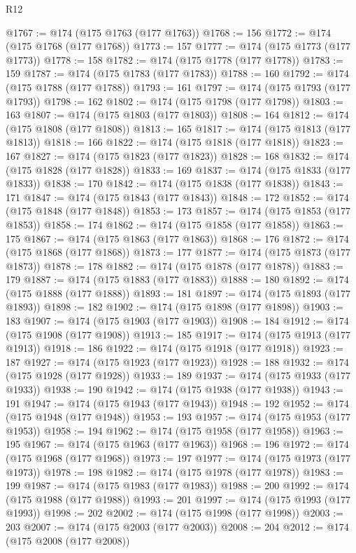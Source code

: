 \begin{lexlean}{R12}
\begin{coremodule}
{{{{{{{{{{{{{{{{{{{{{{{{{{{{{{{{{{{{{{{{{{{{{{{{{{{{{{{{{{{{{{{{{{{{{{{{{{{{{{{{{{{{{{{{{{{{{{{{{{{{{{{{{{@1767 := @174 (@175 @1763 (@177 @1763))
@1768 := 156
@1772 := @174 (@175 @1768 (@177 @1768))
@1773 := 157
@1777 := @174 (@175 @1773 (@177 @1773))
@1778 := 158
@1782 := @174 (@175 @1778 (@177 @1778))
@1783 := 159
@1787 := @174 (@175 @1783 (@177 @1783))
@1788 := 160
@1792 := @174 (@175 @1788 (@177 @1788))
@1793 := 161
@1797 := @174 (@175 @1793 (@177 @1793))
@1798 := 162
@1802 := @174 (@175 @1798 (@177 @1798))
@1803 := 163
@1807 := @174 (@175 @1803 (@177 @1803))
@1808 := 164
@1812 := @174 (@175 @1808 (@177 @1808))
@1813 := 165
@1817 := @174 (@175 @1813 (@177 @1813))
@1818 := 166
@1822 := @174 (@175 @1818 (@177 @1818))
@1823 := 167
@1827 := @174 (@175 @1823 (@177 @1823))
@1828 := 168
@1832 := @174 (@175 @1828 (@177 @1828))
@1833 := 169
@1837 := @174 (@175 @1833 (@177 @1833))
@1838 := 170
@1842 := @174 (@175 @1838 (@177 @1838))
@1843 := 171
@1847 := @174 (@175 @1843 (@177 @1843))
@1848 := 172
@1852 := @174 (@175 @1848 (@177 @1848))
@1853 := 173
@1857 := @174 (@175 @1853 (@177 @1853))
@1858 := 174
@1862 := @174 (@175 @1858 (@177 @1858))
@1863 := 175
@1867 := @174 (@175 @1863 (@177 @1863))
@1868 := 176
@1872 := @174 (@175 @1868 (@177 @1868))
@1873 := 177
@1877 := @174 (@175 @1873 (@177 @1873))
@1878 := 178
@1882 := @174 (@175 @1878 (@177 @1878))
@1883 := 179
@1887 := @174 (@175 @1883 (@177 @1883))
@1888 := 180
@1892 := @174 (@175 @1888 (@177 @1888))
@1893 := 181
@1897 := @174 (@175 @1893 (@177 @1893))
@1898 := 182
@1902 := @174 (@175 @1898 (@177 @1898))
@1903 := 183
@1907 := @174 (@175 @1903 (@177 @1903))
@1908 := 184
@1912 := @174 (@175 @1908 (@177 @1908))
@1913 := 185
@1917 := @174 (@175 @1913 (@177 @1913))
@1918 := 186
@1922 := @174 (@175 @1918 (@177 @1918))
@1923 := 187
@1927 := @174 (@175 @1923 (@177 @1923))
@1928 := 188
@1932 := @174 (@175 @1928 (@177 @1928))
@1933 := 189
@1937 := @174 (@175 @1933 (@177 @1933))
@1938 := 190
@1942 := @174 (@175 @1938 (@177 @1938))
@1943 := 191
@1947 := @174 (@175 @1943 (@177 @1943))
@1948 := 192
@1952 := @174 (@175 @1948 (@177 @1948))
@1953 := 193
@1957 := @174 (@175 @1953 (@177 @1953))
@1958 := 194
@1962 := @174 (@175 @1958 (@177 @1958))
@1963 := 195
@1967 := @174 (@175 @1963 (@177 @1963))
@1968 := 196
@1972 := @174 (@175 @1968 (@177 @1968))
@1973 := 197
@1977 := @174 (@175 @1973 (@177 @1973))
@1978 := 198
@1982 := @174 (@175 @1978 (@177 @1978))
@1983 := 199
@1987 := @174 (@175 @1983 (@177 @1983))
@1988 := 200
@1992 := @174 (@175 @1988 (@177 @1988))
@1993 := 201
@1997 := @174 (@175 @1993 (@177 @1993))
@1998 := 202
@2002 := @174 (@175 @1998 (@177 @1998))
@2003 := 203
@2007 := @174 (@175 @2003 (@177 @2003))
@2008 := 204
@2012 := @174 (@175 @2008 (@177 @2008))
}}}}}}}}}}}}}}}}}}}}}}}}}}}}}}}}}}}}}}}}}}}}}}}}}}}}}}}}}}}}}}}}}}}}}}}}}}}}}}}}}}}}}}}}}}}}}}}}}}}}}}}}}}
\end{coremodule}
\end{lexlean}
